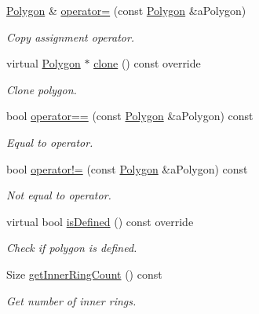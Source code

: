 \begin{DoxyCompactItemize}
\hyperlink{classlibrary_1_1math_1_1geom_1_1d2_1_1objects_1_1_polygon}{Polygon} \& \hyperlink{classlibrary_1_1math_1_1geom_1_1d2_1_1objects_1_1_polygon_afd72b5c2aa958835958d197ee57c3152}{operator=} (const \hyperlink{classlibrary_1_1math_1_1geom_1_1d2_1_1objects_1_1_polygon}{Polygon} \&a\+Polygon)
\begin{DoxyCompactList}\small\item\em Copy assignment operator. \end{DoxyCompactList}\item 
virtual \hyperlink{classlibrary_1_1math_1_1geom_1_1d2_1_1objects_1_1_polygon}{Polygon} $\ast$ \hyperlink{classlibrary_1_1math_1_1geom_1_1d2_1_1objects_1_1_polygon_a15bbbe7e468a50d6059e2df946175e1c}{clone} () const override
\begin{DoxyCompactList}\small\item\em Clone polygon. \end{DoxyCompactList}\item 
bool \hyperlink{classlibrary_1_1math_1_1geom_1_1d2_1_1objects_1_1_polygon_a2d92051aa3535659ec1ca1849ea65fa0}{operator==} (const \hyperlink{classlibrary_1_1math_1_1geom_1_1d2_1_1objects_1_1_polygon}{Polygon} \&a\+Polygon) const
\begin{DoxyCompactList}\small\item\em Equal to operator. \end{DoxyCompactList}\item 
bool \hyperlink{classlibrary_1_1math_1_1geom_1_1d2_1_1objects_1_1_polygon_a904fe22c8a690a6b5eb4f8746602d637}{operator!=} (const \hyperlink{classlibrary_1_1math_1_1geom_1_1d2_1_1objects_1_1_polygon}{Polygon} \&a\+Polygon) const
\begin{DoxyCompactList}\small\item\em Not equal to operator. \end{DoxyCompactList}\item 
virtual bool \hyperlink{classlibrary_1_1math_1_1geom_1_1d2_1_1objects_1_1_polygon_a83e0962f91f0732048e156ad634faaea}{is\+Defined} () const override
\begin{DoxyCompactList}\small\item\em Check if polygon is defined. \end{DoxyCompactList}\item 
Size \hyperlink{classlibrary_1_1math_1_1geom_1_1d2_1_1objects_1_1_polygon_a20d245deda49667f0418591d7772d53d}{get\+Inner\+Ring\+Count} () const
\begin{DoxyCompactList}\small\item\em Get number of inner rings. \end{DoxyCompactList}\item 

\end{DoxyCompactItemize}
